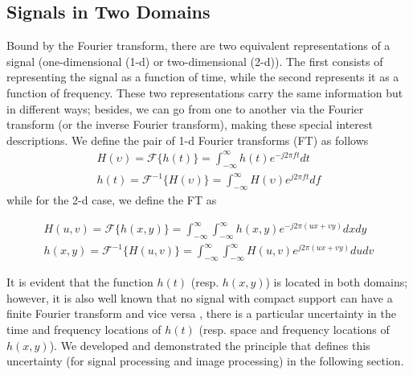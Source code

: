 \subsection{Signals in Two Domains}
Bound by the Fourier transform, there are two equivalent representations of a signal (one-dimensional (1-d) or two-dimensional (2-d)). The first consists of representing the signal as a function of time, while the second represents it as a function of frequency. These two representations carry the same information but in different ways; besides, we can go from one to another via the Fourier transform (or the inverse Fourier transform), making these special interest descriptions. We define the pair of 1-d Fourier transforms (FT) as follows
\begin{equation}\label{eq:fourier_transforms_1d}
    \begin{gathered}
        H(\upsilon) = \mathcal{F}\{h(t)\} = \int_{-\infty}^{\infty} h(t) e^{-j2\pi f t} dt \\
        h(t) = \mathcal{F}^{-1}\{H(\upsilon)\} = \int_{-\infty}^{\infty} H(\upsilon) e^{j2\pi f t} df 
    \end{gathered}
\end{equation}
while for the 2-d case, we define the FT as

\begin{equation}\label{eq:fourier_transforms_2d}
    \begin{gathered}
        H(u, v) = \mathcal{F}\{h(x, y)\} = \int_{-\infty}^{\infty} \int_{-\infty}^{\infty} h(x, y) e^{-j2\pi (ux + vy)} dx dy \\
        h(x, y) = \mathcal{F}^{-1}\{H(u, v)\} = \int_{-\infty}^{\infty} \int_{-\infty}^{\infty}  H(u, v) e^{j2\pi (ux + vy)} du dv 
    \end{gathered}
\end{equation}


It is evident that the function $h(t)$ (resp. $h(x, y)$) is located in both domains; however, it is also well known that no signal with compact support can have a finite Fourier transform and vice versa \citep{Bracewell:FourierBook:1999}, there is a particular uncertainty in the time and frequency locations of $h(t)$ (resp. space and frequency locations of $h(x, y)$). We developed and demonstrated the principle that defines this uncertainty (for signal processing and image processing) in the following section.%

